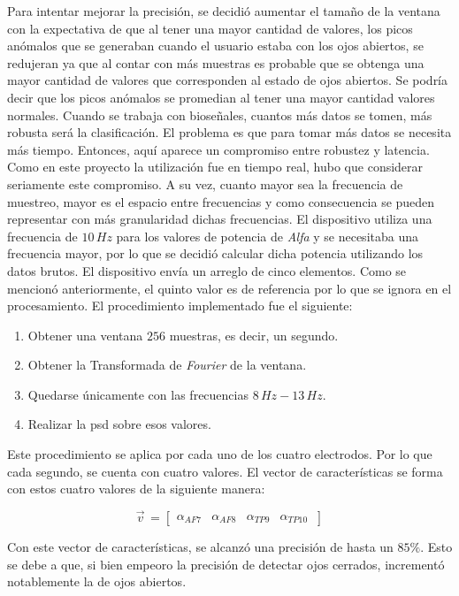 Para intentar mejorar la precisión, se decidió aumentar el tamaño de la ventana con la expectativa de que al tener una mayor cantidad de valores, los picos anómalos que se generaban cuando el usuario estaba con los ojos abiertos, se redujeran ya que al contar con más muestras es probable que se obtenga una mayor cantidad de valores que corresponden al estado de ojos abiertos. Se podría decir que los picos anómalos se promedian al tener una mayor cantidad valores normales. Cuando se trabaja con bioseñales, cuantos más datos se tomen, más robusta será la clasificación. El problema es que para tomar más datos se necesita más tiempo. Entonces, aquí aparece un compromiso entre robustez y latencia. Como en este proyecto la utilización fue en tiempo real, hubo que considerar seriamente este compromiso. A su vez, cuanto mayor sea la frecuencia de muestreo, mayor es el espacio entre frecuencias y como consecuencia se pueden representar con más granularidad dichas frecuencias. El dispositivo utiliza una frecuencia de $10 \, Hz$ para los valores de potencia de \emph{Alfa} y se necesitaba una frecuencia mayor, por lo que se decidió calcular dicha potencia utilizando los datos brutos. El dispositivo envía un arreglo de cinco elementos. Como se mencionó anteriormente, el quinto valor es de referencia por lo que se ignora en el procesamiento. El procedimiento implementado fue el siguiente:

 \begin{enumerate}
 \item Obtener una ventana $256$ muestras, es decir, un segundo.
 \item Obtener la Transformada de \emph{Fourier} de la ventana.
 \item Quedarse únicamente con las frecuencias $8 \, Hz-13 \, Hz$.
 \item Realizar la \acrshort{psd} sobre esos valores.
 \end{enumerate}
 
Este procedimiento se aplica por cada uno de los cuatro electrodos. Por lo que cada segundo, se cuenta con cuatro valores. El vector de características se forma con estos cuatro valores de la siguiente manera:
 
\[
  \vec{v}^{\, }=
  \left[ {\begin{array}{cccc}
   \alpha_{AF7}  & \alpha_{AF8} & \alpha_{TP9} & \alpha_{TP10}  \     \end{array} } \right]
\] 

Con este vector de características, se alcanzó una precisión de hasta un $ 85 \%$. Esto se debe a que, si bien empeoro la precisión de detectar ojos cerrados, incrementó notablemente la de ojos abiertos.
 
